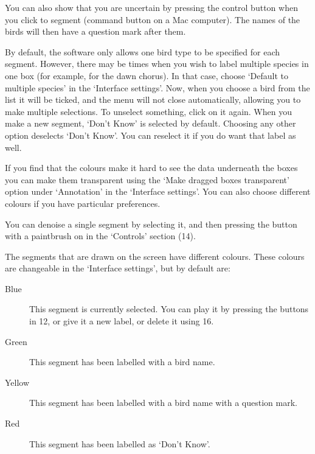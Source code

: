 \documentclass{article}
\begin{document}
You can also show that you are uncertain by pressing the control button when you click to segment (command button on a Mac computer). The names of the birds will then have a question mark after them. 

By default, the software only allows one bird type to be specified for each segment. However, there may be times when you wish to label multiple species in one box (for example, for the dawn chorus). In that case, choose `Default to multiple species' in the `Interface settings'. Now, when you choose a bird from the list it will be ticked, and the menu will not close automatically, allowing you to make multiple selections. To unselect something, click on it again. When you make a new segment, `Don't Know' is selected by default. Choosing any other option deselects `Don't Know'. You can reselect it if you do want that label as well. 

If you find that the colours make it hard to see the data underneath the boxes you can make them transparent using the `Make dragged boxes transparent' option under `Annotation' in the `Interface settings'. You can also choose different colours if you have particular preferences.

You can denoise a single segment by selecting it, and then pressing the button with a paintbrush on in the `Controls' section (14). 


The segments that are drawn on the screen have different colours. These colours are changeable in the `Interface settings', but by default are:
	\begin{description} 
	\item[Blue] This segment is currently selected. You can play it by pressing the buttons in 12, or give it a new label, or delete it using 16. 
	\item[Green] This segment has been labelled with a bird name.
	\item[Yellow] This segment has been labelled with a bird name with a question mark.
	\item[Red] This segment has been labelled as `Don't Know'.
	\end{description}
\end{document}
